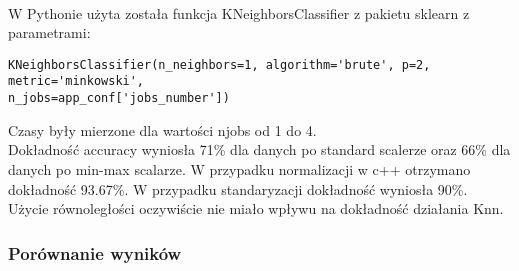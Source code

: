 \documentclass[a4paper,11pt]{article}
\begin{document}
\paragraph{}W Pythonie użyta została funkcja KNeighborsClassifier z pakietu sklearn z parametrami:
\begin{lstlisting}
KNeighborsClassifier(n_neighbors=1, algorithm='brute', p=2, metric='minkowski',
n_jobs=app_conf['jobs_number'])
\end{lstlisting}
Czasy były mierzone dla wartości njobs od 1 do 4. \\
Dokładność accuracy wyniosła 71\% dla danych po standard scalerze oraz 66\% dla danych po min-max scalarze.  
W przypadku normalizacji w c++ otrzymano dokładność 93.67\%. W przypadku standaryzacji dokładność wyniosła 90\%.
Użycie równoległości oczywiście nie miało wpływu na dokładność działania Knn.
\subsubsection{Porównanie wyników} 
\end{document}
